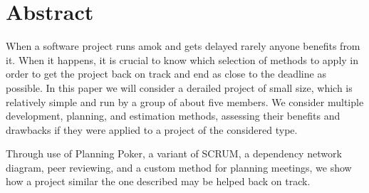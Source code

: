 \section*{Abstract}
\lhead{} %

When a software project runs amok and gets delayed rarely anyone benefits from it.
When it happens, it is crucial to know which selection of methods to apply in order to get the project back on track and end as close to the deadline as possible.
In this paper we will consider a derailed project of small size, which is relatively simple and run by a group of about five members.
We consider multiple development, planning, and estimation methods, assessing their benefits and drawbacks if they were applied to a project of the considered type.

Through use of Planning Poker, a variant of SCRUM, a dependency network diagram, peer reviewing, and a custom method for planning meetings, we show how a project similar the one described may be helped back on track.

\newpage
\fancyhead[R]{\leftmark}
\fancyhead[L]{\rightmark}
